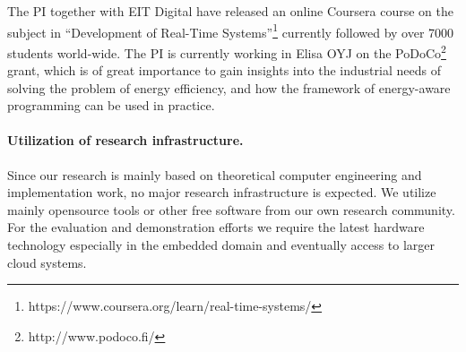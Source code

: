 \documentclass{article}
\begin{document}
The PI together with EIT Digital have released an online Coursera course on the subject in ``Development of Real-Time Systems''\footnote{https://www.coursera.org/learn/real-time-systems/} currently followed by over 7000 students world-wide.
The PI is currently working in Elisa OYJ on the PoDoCo\footnote{http://www.podoco.fi/} grant, which is of great importance to gain insights into the industrial needs of solving the problem of energy efficiency, 
and how the framework of energy-aware programming can be used in practice.

\paragraph{Utilization of research infrastructure. }
Since our research is mainly based on theoretical computer engineering and implementation work, no major research infrastructure is expected.
We utilize mainly opensource tools or other free software from our own research community.
For the evaluation and demonstration efforts we require the latest hardware technology especially in the embedded domain and eventually access to larger cloud systems.
\end{document}
